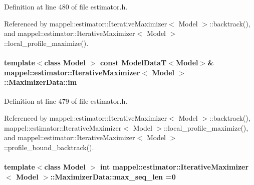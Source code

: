 Definition at line 480 of file estimator.\+h.



Referenced by mappel\+::estimator\+::\+Iterative\+Maximizer$<$ Model $>$\+::backtrack(), and mappel\+::estimator\+::\+Iterative\+Maximizer$<$ Model $>$\+::local\+\_\+profile\+\_\+maximize().

\paragraph[{\texorpdfstring{im}{im}}]{\setlength{\rightskip}{0pt plus 5cm}template$<$class Model $>$ const {\bf Model\+DataT}$<$Model$>$\& {\bf mappel\+::estimator\+::\+Iterative\+Maximizer}$<$ Model $>$\+::Maximizer\+Data\+::im}\hypertarget{classmappel_1_1estimator_1_1IterativeMaximizer_1_1MaximizerData_a01a762941a06e7f6839817971674c354}{}\label{classmappel_1_1estimator_1_1IterativeMaximizer_1_1MaximizerData_a01a762941a06e7f6839817971674c354}


Definition at line 479 of file estimator.\+h.



Referenced by mappel\+::estimator\+::\+Iterative\+Maximizer$<$ Model $>$\+::backtrack(), mappel\+::estimator\+::\+Iterative\+Maximizer$<$ Model $>$\+::local\+\_\+profile\+\_\+maximize(), and mappel\+::estimator\+::\+Iterative\+Maximizer$<$ Model $>$\+::profile\+\_\+bound\+\_\+backtrack().

\paragraph[{\texorpdfstring{max\+\_\+seq\+\_\+len}{max_seq_len}}]{\setlength{\rightskip}{0pt plus 5cm}template$<$class Model $>$ int {\bf mappel\+::estimator\+::\+Iterative\+Maximizer}$<$ Model $>$\+::Maximizer\+Data\+::max\+\_\+seq\+\_\+len =0\hspace{0.3cm}{\ttfamily [protected]}}\hypertarget{classmappel_1_1estimator_1_1IterativeMaximizer_1_1MaximizerData_a02b371b8d27f7458223b7442d9f6b55c}{}\label{classmappel_1_1estimator_1_1IterativeMaximizer_1_1MaximizerData_a02b371b8d27f7458223b7442d9f6b55c}


